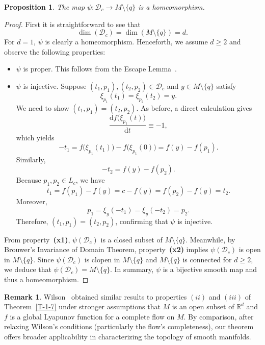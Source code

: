 \documentclass[11pt,letterpaper]{amsart}
\theoremstyle{plain}
\newtheorem{proposition}[theorem]{Proposition}
\theoremstyle{definition}
\newtheorem{remark}[theorem]{Remark}
\theoremstyle{remark}
\numberwithin{equation}{section}
\begin{document}
\begin{proposition}\label{P-2-13}
The map $\psi:\mathcal D_c\to M\setminus\{q\}$ is a homeomorphism.
\end{proposition}
\begin{proof}
First it is straightforward to see that
\[
\dim\left(\mathcal D_c\right)=\dim \left(M\setminus\{q\}\right)=d.
\]
For $d=1$, $\psi$ is clearly a homeomorphism. Henceforth, we assume $d\geq 2$ and observe the following properties:
\begin{itemize}
\item[\textbf{(x1)}] $\psi$ is proper. This follows from the Escape Lemma~\cite[Lemma 9.19]{Lee-2018}.
\item[\textbf{(x2)}] $\psi$ is injective. Suppose $(t_1,p_1),(t_2,p_2)\in\mathcal D_c$ and $y\in M\setminus\{q\}$ satisfy
    \[
\xi_{p_1}(t_1)=\xi_{p_2}(t_2)=y.
    \]
    We need to show $(t_1,p_1)=(t_2,p_2)$. As before, a direct calculation gives
    \[
    \frac{\mathrm d f\big(\xi_{p_1}(t)\big)}{\mathrm d t}\equiv-1,
    \]
    which yields
    \[
    -t_1=f\big(\xi_{p_1}(t_1)\big)-f\big(\xi_{p_1}(0)\big)=f(y)-f(p_1).
    \]
    Similarly,
    \[
    -t_2=f(y)-f(p_2).
    \]
    Because $p_1,p_2\in L_c$, we have
    \[
    t_1=f(p_1)-f(y)=c-f(y)=f(p_2)-f(y)=t_2.
    \]
Moreover,
    \[
    p_1=\xi_y(-t_1)=\xi_y(-t_2)=p_2.
    \]
Therefore, $(t_1,p_1)=(t_2,p_2)$, confirming that $\psi$ is injective.
\end{itemize}

From property~\textbf{(x1)}, $\psi(\mathcal D_c)$ is a closed subset of $M\setminus\{q\}$. Meanwhile, by Brouwer's Invariance of Domain Theorem,
property~\textbf{(x2)} implies $\psi(\mathcal D_c)$ is open in $M\setminus\{q\}$. Since $\psi(\mathcal D_c)$ is clopen in $M\setminus\{q\}$ and  $M\setminus\{q\}$ is connected for $d\geq 2$, we deduce that
$\psi(\mathcal D_c)=M\setminus\{q\}$. In summary, $\psi$ is a bijective smooth map and thus a homeomorphism.
\end{proof}

\begin{remark}
Wilson~\cite{Wilson-1967} obtained similar results to properties $(ii)$ and $(iii)$ of Theorem~\ref{T-1-7} under stronger assumptions that $M$ is an open subset of
$\mathbb R^d$ and $f$ is a global Lyapunov function for a complete flow on $M$. By comparison, after relaxing Wilson's conditions (particularly the flow's completeness), our theorem offers broader applicability  in characterizing the topology of smooth manifolds.
\end{remark}
\end{document}
